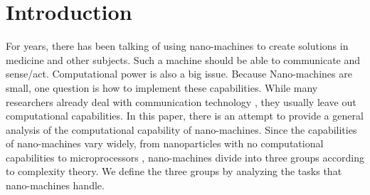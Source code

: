 \documentclass[10pt,sigconf]{acmart}
\begin{document}
\section{Introduction}
For years, there has been talking of using nano-machines to create solutions in medicine and other subjects. Such a machine should be able to communicate and sense/act. Computational power is also a big issue.
Because Nano-machines are small, one question is how to implement these capabilities. 
While many researchers already deal with communication technology \cite{akyildiz2008nanonetworks}, they usually leave out computational capabilities.
In this paper, there is an attempt to provide a general analysis of the computational capability of nano-machines.
Since the capabilities of nano-machines vary widely, from nanoparticles with no computational capabilities to microprocessors \cite{cobo2010bacteria}, nano-machines divide into three groups according to complexity theory.
We define the three groups by analyzing the tasks that nano-machines handle.
\end{document}
